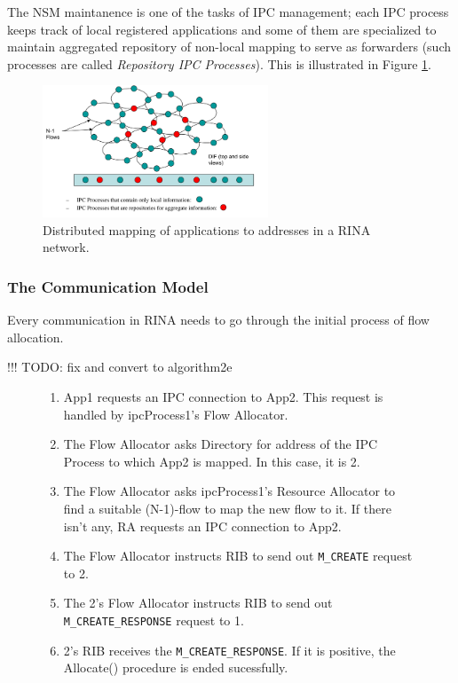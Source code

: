                 The NSM maintanence is one of the tasks of IPC management; each IPC process keeps track of local registered applications and some of them are specialized to maintain aggregated repository of non-local mapping to serve as forwarders (such processes are called \emph{Repository IPC Processes}). This is illustrated in Figure \ref{fig:rina_nsm}.

                \begin{figure}[H]
                    \begin{center}
                        \includegraphics[width=0.6\textwidth]{fig/archs_rina-nsm.png}
                      \caption{Distributed mapping of applications to addresses in a RINA network.}
                      \label{fig:rina_nsm}
                    \end{center}
                \end{figure}


            \subsubsection{The Communication Model}\label{archs:rina:communication}

                Every communication in RINA needs to go through the initial process of flow allocation.

                !!! TODO: fix and convert to algorithm2e

                \begin{figure}[H]
                    \begin{enumerate}
                        \item App1 requests an IPC connection to App2. This request is handled by ipcProcess1's Flow Allocator.
                        \item The Flow Allocator asks Directory for address of the IPC Process to which App2 is mapped. In this case, it is 2.
                        \item The Flow Allocator asks ipcProcess1's Resource Allocator to find a suitable (N-1)-flow to map the new flow to it. If there isn't any, RA requests an IPC connection to App2.
                        \item The Flow Allocator instructs RIB to send out \texttt{M\_CREATE} request to 2.
                        \item The 2's Flow Allocator instructs RIB to send out \texttt{M\_CREATE\_RESPONSE} request to 1.
                        \item 2's RIB receives the \texttt{M\_CREATE\_RESPONSE}. If it is positive, the Allocate() procedure is ended sucessfully.
                    \end{enumerate}
                \end{figure}

